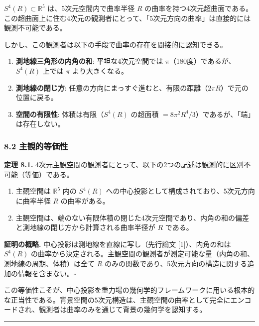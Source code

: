 \documentclass[a4paper,11pt]{ltjsarticle}
\providecommand{\tightlist}{\setlength{\itemsep}{0pt}\setlength{\parskip}{0pt}}
\begin{document}
\(S^4(R) \subset \mathbb{R}^5\) は、5次元空間内で曲率半径 \(R\)
の曲率を持つ4次元超曲面である。この超曲面上に住む4次元の観測者にとって、「5次元方向の曲率」は直接的には観測不可能である。

しかし、この観測者は以下の手段で曲率の存在を間接的に認知できる。

\begin{enumerate}
\def\labelenumi{\arabic{enumi}.}
\tightlist
\item
  \textbf{測地線三角形の内角の和}: 平坦な4次元空間では
  \(\pi\)（180度）であるが、\(S^4(R)\) 上では \(\pi\) より大きくなる。
\item
  \textbf{測地線の閉じ方}:
  任意の方向にまっすぐ進むと、有限の距離（\(2\pi R\)）で元の位置に戻る。
\item
  \textbf{空間の有限性}: 体積は有限（\(S^4(R)\) の超面積
  \(= 8\pi^2 R^4/3\)）であるが、「端」は存在しない。
\end{enumerate}

\subsubsection{8.2
主観的等価性}\label{ux4e3bux89b3ux7684ux7b49ux4fa1ux6027}

\textbf{定理 8.1.}
4次元主観空間の観測者にとって、以下の2つの記述は観測的に区別不可能（等価）である。

\begin{enumerate}
\def\labelenumi{(\alph{enumi})}
\item
  主観空間は \(\mathbb{R}^5\) 内の \(S^4(R)\)
  への中心投影として構成されており、5次元方向に曲率半径 \(R\)
  の曲率がある。
\item
  主観空間は、端のない有限体積の閉じた4次元空間であり、内角の和の偏差と測地線の閉じ方から計算される曲率半径が
  \(R\) である。
\end{enumerate}

\textbf{証明の概略.} 中心投影は測地線を直線に写し（先行論文
{[}1{]}）、内角の和は \(S^4(R)\)
の曲率から決定される。主観空間の観測者が測定可能な量（内角の和、測地線の周期、体積）は全て
\(R\)
のみの関数であり、5次元方向の構造に関する追加の情報を含まない。\(\square\)

この等価性こそが、中心投影を重力場の幾何学的フレームワークに用いる根本的な正当性である。背景空間の5次元構造は、主観空間の曲率として完全にエンコードされ、観測者は曲率のみを通じて背景の幾何学を認知する。

\begin{center}\rule{0.5\linewidth}{0.5pt}\end{center}
\end{document}
